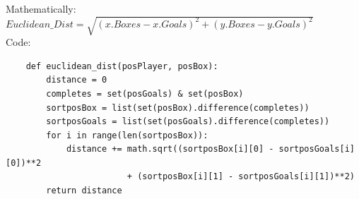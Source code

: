 \documentclass[english, a4paper,12pt]{article}
\begin{document}
\newpage
Mathematically: 
\vspace*{3mm}\\
\hspace*{10mm}$Euclidean\_Dist = \sqrt{(x.Boxes - x.Goals)^2 + (y.Boxes - y.Goals)^2}$ \\
Code:
\begin{verbatim}
    def euclidean_dist(posPlayer, posBox):
        distance = 0
        completes = set(posGoals) & set(posBox)
        sortposBox = list(set(posBox).difference(completes))
        sortposGoals = list(set(posGoals).difference(completes))
        for i in range(len(sortposBox)):
            distance += math.sqrt((sortposBox[i][0] - sortposGoals[i][0])**2 
                        + (sortposBox[i][1] - sortposGoals[i][1])**2)
        return distance
\end{verbatim}
\end{document}

